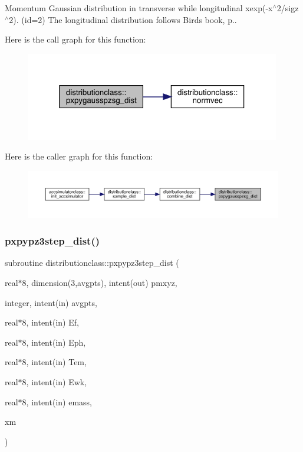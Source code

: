 Momentum Gaussian distribution in transverse while longitudinal xexp(-\/x$^\wedge$2/sigz$^\wedge$2). (id=2) The longitudinal distribution follows Bird\textquotesingle{}s book, p.. 

Here is the call graph for this function\+:\nopagebreak
\begin{figure}[H]
\begin{center}
\leavevmode
\includegraphics[width=315pt]{namespacedistributionclass_ab6dde242aa247f41d9581455e84607fb_cgraph}
\end{center}
\end{figure}
Here is the caller graph for this function\+:\nopagebreak
\begin{figure}[H]
\begin{center}
\leavevmode
\includegraphics[width=350pt]{namespacedistributionclass_ab6dde242aa247f41d9581455e84607fb_icgraph}
\end{center}
\end{figure}
\mbox{\label{namespacedistributionclass_aaeb585c7c5a8664f047fb95fc7721059}} 
\subsubsection{\texorpdfstring{pxpypz3step\_dist()}{pxpypz3step\_dist()}}
{\footnotesize\ttfamily subroutine distributionclass\+::pxpypz3step\+\_\+dist (\begin{DoxyParamCaption}\item[{real$\ast$8, dimension(3,avgpts), intent(out)}]{pmxyz,  }\item[{integer, intent(in)}]{avgpts,  }\item[{real$\ast$8, intent(in)}]{Ef,  }\item[{real$\ast$8, intent(in)}]{Eph,  }\item[{real$\ast$8, intent(in)}]{Tem,  }\item[{real$\ast$8, intent(in)}]{Ewk,  }\item[{real$\ast$8, intent(in)}]{emass,  }\item[{}]{xm }\end{DoxyParamCaption})}



